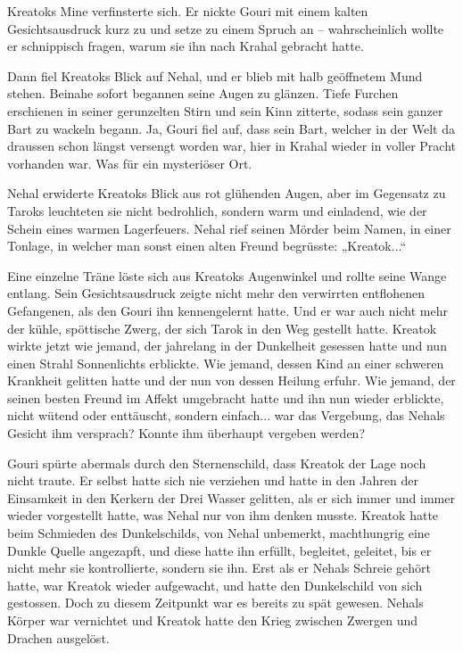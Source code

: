 \documentclass[10pt, a4paper, oneside]{book}
\begin{document}
Kreatoks Mine verfinsterte sich. Er nickte Gouri mit einem kalten Gesichtsausdruck kurz zu und setze zu einem Spruch an – wahrscheinlich wollte er schnippisch fragen, warum sie ihn nach Krahal gebracht hatte.

Dann fiel Kreatoks Blick auf Nehal, und er blieb mit halb geöffnetem Mund stehen. Beinahe sofort begannen seine Augen zu glänzen. Tiefe Furchen erschienen in seiner gerunzelten Stirn und sein Kinn zitterte, sodass sein ganzer Bart zu wackeln begann. Ja, Gouri fiel auf, dass sein Bart, welcher in der Welt da draussen schon längst versengt worden war, hier in Krahal wieder in voller Pracht vorhanden war. Was für ein mysteriöser Ort.

Nehal erwiderte Kreatoks Blick aus rot glühenden Augen, aber im Gegensatz zu Taroks leuchteten sie nicht bedrohlich, sondern warm und einladend, wie der Schein eines warmen Lagerfeuers. Nehal rief seinen Mörder beim Namen, in einer Tonlage, in welcher man sonst einen alten Freund begrüsste: „Kreatok...“

Eine einzelne Träne löste sich aus Kreatoks Augenwinkel und rollte seine Wange entlang. Sein Gesichtsausdruck zeigte nicht mehr den verwirrten entflohenen Gefangenen, als den Gouri ihn kennengelernt hatte. Und er war auch nicht mehr der kühle, spöttische Zwerg, der sich Tarok in den Weg gestellt hatte. Kreatok wirkte jetzt wie jemand, der jahrelang in der Dunkelheit gesessen hatte und nun einen Strahl Sonnenlichts erblickte. Wie jemand, dessen Kind an einer schweren Krankheit gelitten hatte und der nun von dessen Heilung erfuhr. Wie jemand, der seinen besten Freund im Affekt umgebracht hatte und ihn nun wieder erblickte, nicht wütend oder enttäuscht, sondern einfach... war das Vergebung, das Nehals Gesicht ihm versprach? Konnte ihm überhaupt vergeben werden?

Gouri spürte abermals durch den Sternenschild, dass Kreatok der Lage noch nicht traute. Er selbst hatte sich nie verziehen und hatte in den Jahren der Einsamkeit in den Kerkern der Drei Wasser gelitten, als er sich immer und immer wieder vorgestellt hatte, was Nehal nur von ihm denken musste. Kreatok hatte beim Schmieden des Dunkelschilds, von Nehal unbemerkt, machthungrig eine Dunkle Quelle angezapft, und diese hatte ihn erfüllt, begleitet, geleitet, bis er nicht mehr sie kontrollierte, sondern sie ihn. Erst als er Nehals Schreie gehört hatte, war Kreatok wieder aufgewacht, und hatte den Dunkelschild von sich gestossen. Doch zu diesem Zeitpunkt war es bereits zu spät gewesen. Nehals Körper war vernichtet und Kreatok hatte den Krieg zwischen Zwergen und Drachen ausgelöst.
\end{document}
